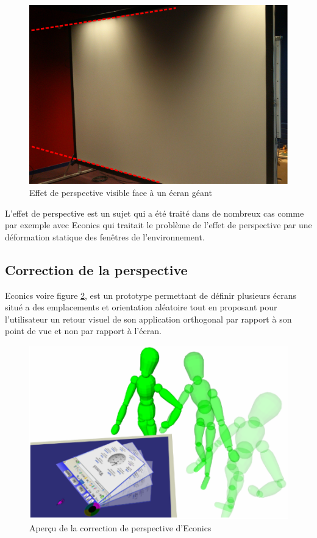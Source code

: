 \begin{figure}[!ht]
	\center	
	\includegraphics[scale=0.1]{image/perspectiveScreen.jpg}
	\caption{Effet de perspective visible face à un écran géant}
	\label{fig:perspectiveScreen}
\end{figure}

L'effet de perspective est un sujet qui a été traité dans de nombreux cas comme par exemple avec Econics \cite{Nacenta:2007:EPI:1294211.1294260} qui traitait le problème de l'effet de perspective par une déformation statique des fenêtres de l'environnement. 

\subsection{Correction de la perspective}


Econics voire figure \ref{fig:econics}, est un prototype permettant de définir plusieurs écrans situé a des emplacements et orientation aléatoire tout en proposant pour l'utilisateur un retour visuel de son application orthogonal par rapport à son point de vue et non par rapport à l'écran.

\begin{figure}[!ht]
	\center	
	\includegraphics[scale=0.5]{image/econics.png}
	\caption{Aperçu de la correction de perspective d'Econics}
	\label{fig:econics}
\end{figure}

